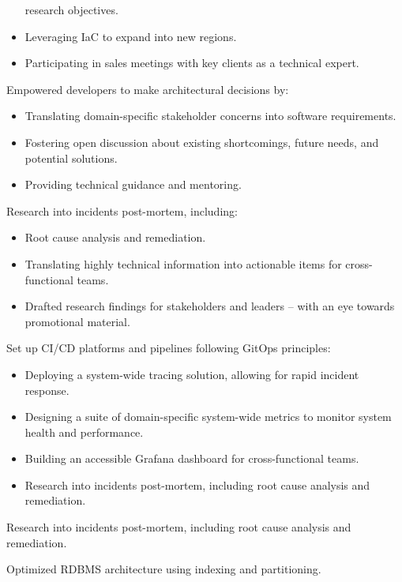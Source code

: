 \begin{jobReflectizLead}
\begin{itemize}
        research objectives.
      \item Leveraging IaC to expand into new regions.
      \item Participating in sales meetings with key clients as a
        technical expert.
    \end{itemize}
  \item Empowered developers to make architectural decisions by:
    \begin{itemize}
      \item Translating domain-specific stakeholder concerns into
        software requirements.
      \item Fostering open discussion about existing shortcomings,
        future needs, and potential solutions.
      \item Providing technical guidance and mentoring.
    \end{itemize}
  \item Research into incidents post-mortem, including:
    \begin{itemize}
      \item Root cause analysis and remediation.
      \item Translating highly technical information into actionable
        items for cross-functional teams.
      \item Drafted research findings for stakeholders and leaders --
        with an eye towards promotional material.
    \end{itemize}
  \item Set up CI/CD platforms and pipelines following GitOps principles:
    \begin{itemize}
      \item Deploying a system-wide tracing solution, allowing for
        rapid incident response.
      \item Designing a suite of domain-specific system-wide metrics
        to monitor system health and performance.
      \item Building an accessible Grafana dashboard for cross-functional teams.
      \item Research into incidents post-mortem, including root cause
        analysis and remediation.
    \end{itemize}
  \item Research into incidents post-mortem, including root cause
    analysis and remediation.
  \item Optimized RDBMS architecture using indexing and partitioning.
  \end{jobReflectizLead}